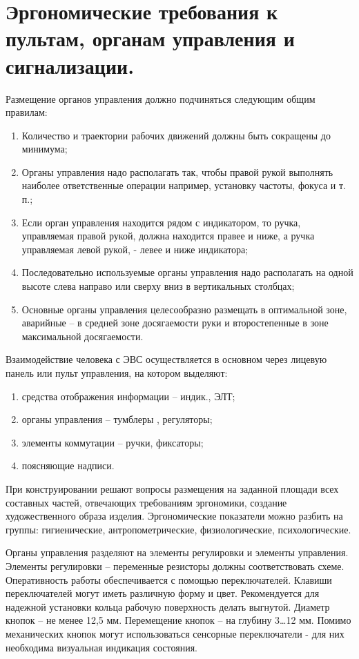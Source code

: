 \documentclass[unicode, 12pt, a4paper, oneside]{article}
\begin{document}
\section{Эргономические требования к пультам, органам управления и сигнализации.}

Размещение органов управления должно подчиняться следующим общим правилам:

\begin{enumerate}
\item Количество и траектории рабочих движений должны быть сокращены до минимума;
\item Органы управления надо располагать так, чтобы правой рукой выполнять наиболее ответственные операции например, установку частоты, фокуса и т. п.;
\item Если орган управления находится рядом с индикатором, то ручка, управляемая правой рукой, должна находится правее и ниже, а ручка управляемая левой рукой, - левее и ниже индикатора;
\item Последовательно используемые органы управления надо располагать на одной высоте слева направо или сверху вниз в вертикальных столбцах;
\item Основные органы управления целесообразно размещать в оптимальной зоне, аварийные – в средней зоне досягаемости руки и второстепенные в зоне максимальной досягаемости.
\end{enumerate}

Взаимодействие человека с ЭВС осуществляется в основном через лицевую панель или пульт управления, на котором выделяют:

\begin{enumerate} 
\item средства отображения информации – индик., ЭЛТ; 
\item органы управления – тумблеры , регуляторы;
\item элементы коммутации – ручки, фиксаторы; 
\item поясняющие надписи.
\end{enumerate}

При конструировании решают вопросы размещения на заданной площади всех составных частей, отвечающих требованиям эргономики, создание художественного образа изделия. Эргономические показатели можно разбить на группы: гигиенические, антропометрические, физиологические, психологические. 

Органы управления разделяют на элементы регулировки и элементы управления. Элементы регулировки – переменные резисторы должны соответствовать схеме. Оперативность работы обеспечивается с помощью переключателей. Клавиши переключателей могут иметь различную форму и цвет. Рекомендуется для надежной установки кольца рабочую поверхность делать выгнутой. Диаметр кнопок – не менее 12,5 мм. Перемещение кнопок – на глубину 3…12 мм. Помимо механических кнопок могут использоваться сенсорные переключатели - для них необходима визуальная индикация состояния.
\end{document}
